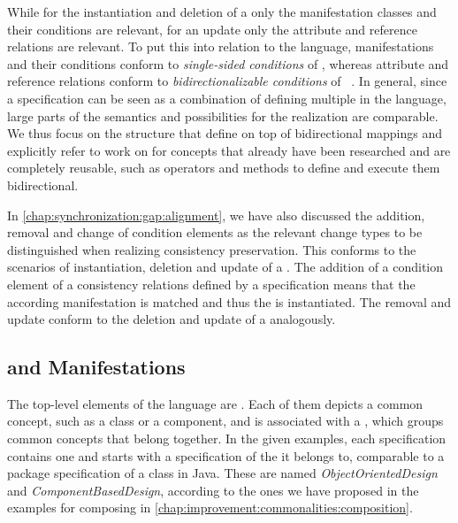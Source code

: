 While for the instantiation and deletion of a \commonality only the manifestation classes and their conditions are relevant, for an update only the attribute and reference relations are relevant.
To put this into relation to the \mappings language, manifestations and their conditions conform to \emph{single-sided conditions} of \mappings, whereas attribute and reference relations conform to \emph{bidirectionalizable conditions} of \mappings~\cite[Sec. 7.2.1]{klare2020Vitruv-JSS}.
In general, since a \commonalities specification can be seen as a combination of defining multiple \mappings in the \mappings language, large parts of the semantics and possibilities for the realization are comparable.
We thus focus on the structure that \commonalities define on top of bidirectional mappings and explicitly refer to work on \mappings for concepts that already have been researched and are completely reusable, such as operators and methods to define and execute them bidirectional.

In \autoref{chap:synchronization:gap:alignment}, we have also discussed the addition, removal and change of condition elements as the relevant change types to be distinguished when realizing consistency preservation.
This conforms to the scenarios of instantiation, deletion and update of a \commonality.
The addition of a condition element of a consistency relations defined by a \commonality specification means that the according manifestation is matched and thus the \commonality is instantiated.
The removal and update conform to the deletion and update of a \commonality analogously.


\subsection{\Commonalities and Manifestations}

The top-level elements of the \commonalities language are \commonalities.
Each of them depicts a common concept, such as a class or a component, and is associated with a \conceptmetamodel, which groups common concepts that belong together.
In the given examples, each specification contains one \commonality and starts with a specification of the \conceptmetamodel it belongs to, comparable to a package specification of a class in Java.
These \conceptmetamodels are named \emph{ObjectOrientedDesign} and \emph{ComponentBasedDesign}, according to the ones we have proposed in the examples for composing \commonalities in \autoref{chap:improvement:commonalities:composition}.


